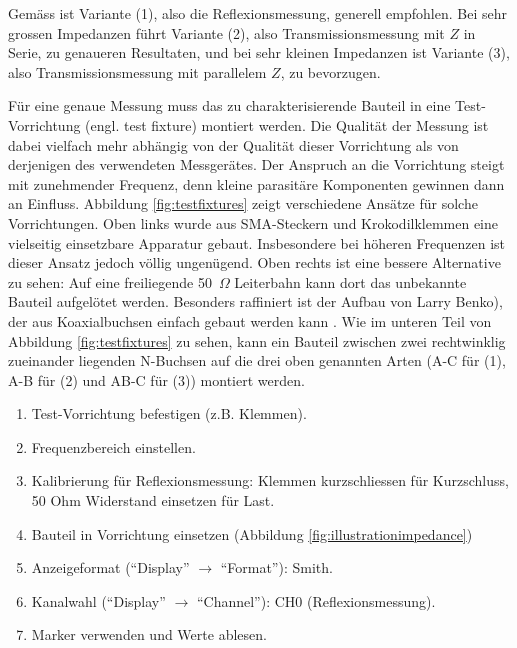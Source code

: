 \documentclass[twoside,a4paper,11pt,halfparskip,DIV=11,notitlepage]{scrartcl}
\newcommand{\Ohm}{$\Omega$\xspace}
\begin{document}
Gemäss \cite{tech2018performing} ist Variante (1), also die Reflexionsmessung, generell
empfohlen. Bei sehr grossen Impedanzen führt Variante (2), also Transmissionsmessung
mit $Z$ in Serie, zu genaueren Resultaten, und bei sehr kleinen Impedanzen
ist Variante (3), also Transmissionsmessung mit parallelem $Z$, zu bevorzugen.

Für eine genaue Messung muss das zu charakterisierende Bauteil in eine Test-Vorrichtung
(engl. test fixture) montiert werden. Die Qualität der Messung ist dabei vielfach
mehr abhängig von der Qualität dieser Vorrichtung als von derjenigen des verwendeten
Messgerätes. Der Anspruch an die Vorrichtung steigt mit zunehmender Frequenz,
denn kleine parasitäre Komponenten gewinnen dann an Einfluss. Abbildung
\ref{fig:testfixtures} zeigt verschiedene Ansätze für solche Vorrichtungen.
Oben links wurde aus SMA-Steckern und Krokodilklemmen eine vielseitig
einsetzbare Apparatur gebaut. Insbesondere bei höheren Frequenzen ist dieser
Ansatz jedoch völlig ungenügend. Oben rechts ist eine bessere Alternative zu
sehen: Auf eine freiliegende 50~\Ohm Leiterbahn kann dort das unbekannte
Bauteil aufgelötet werden. Besonders raffiniert ist der Aufbau von Larry
Benko), der aus Koaxialbuchsen einfach gebaut werden kann
\cite{benko2020impedance}.  Wie im unteren Teil von Abbildung
\ref{fig:testfixtures} zu sehen, kann ein Bauteil zwischen zwei rechtwinklig
zueinander liegenden N-Buchsen auf die drei oben genannten Arten (A-C für (1),
A-B für (2) und AB-C für (3)) montiert werden.


\begin{enumerate}
    \item Test-Vorrichtung befestigen (z.B. Klemmen).
    \item Frequenzbereich einstellen.
    \item Kalibrierung für Reflexionsmessung: Klemmen kurzschliessen für Kurzschluss, 50 Ohm Widerstand
        einsetzen für Last.
    \item Bauteil in Vorrichtung einsetzen (Abbildung \ref{fig:illustrationimpedance})
    \item Anzeigeformat (``Display'' $\longrightarrow$ ``Format''): Smith.
    \item Kanalwahl (``Display'' $\longrightarrow$ ``Channel''): CH0 (Reflexionsmessung).
    \item Marker verwenden und Werte ablesen.
\end{enumerate}
\end{document}
